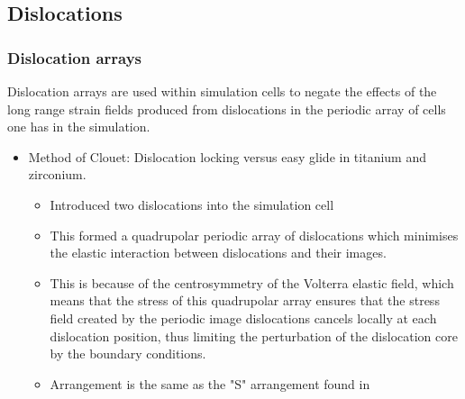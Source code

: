 \documentclass[11pt]{article}
\begin{document}
\subsection{Dislocations}
\label{sec:org088f70b}
\subsubsection{Dislocation arrays}
\label{sec:org09b77c0}
Dislocation arrays are used within simulation cells to negate the effects of
the long range strain fields produced from dislocations in the periodic array
of cells one has in the simulation.
\begin{itemize}
\item Method of Clouet: Dislocation locking versus easy glide in titanium and
zirconium. \cite{Clouet2015} 
\begin{itemize}
\item Introduced two dislocations into the simulation cell
\item This formed a quadrupolar periodic array of dislocations which
minimises the elastic interaction between dislocations and their
images.
\item This is because of the centrosymmetry of the Volterra elastic field,
which means that the stress of this quadrupolar array ensures that the
stress field created by the periodic image dislocations cancels locally
at each dislocation position, thus limiting the perturbation of the
dislocation core by the boundary conditions.
\item Arrangement is the same as the "S" arrangement found in
\cite{Clouet2012}
\end{itemize}
\end{itemize}
\end{document}
